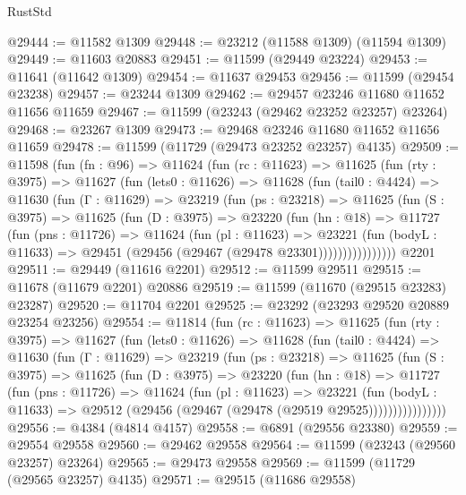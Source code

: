 \begin{lexlean}{RustStd}
\begin{coremodule}
@29444 := @11582 @1309
@29448 := @23212 (@11588 @1309) (@11594 @1309)
@29449 := @11603 @20883
@29451 := @11599 (@29449 @23224)
@29453 := @11641 (@11642 @1309)
@29454 := @11637 @29453
@29456 := @11599 (@29454 @23238)
@29457 := @23244 @1309
@29462 := @29457 @23246 @11680 @11652 @11656 @11659
@29467 := @11599 (@23243 (@29462 @23252 @23257) @23264)
@29468 := @23267 @1309
@29473 := @29468 @23246 @11680 @11652 @11656 @11659
@29478 := @11599 (@11729 (@29473 @23252 @23257) @4135)
@29509 := @11598
    (fun (fn : @96) =>
    @11624
      (fun (rc : @11623) =>
      @11625
        (fun (rty : @3975) =>
        @11627
          (fun (lets0 : @11626) =>
          @11628
            (fun (tail0 : @4424) =>
            @11630
              (fun (Γ : @11629) =>
              @23219
                (fun (ps : @23218) =>
                @11625
                  (fun (S : @3975) =>
                  @11625
                    (fun (D : @3975) =>
                    @23220
                      (fun (hn : @18) =>
                      @11727
                        (fun (pns : @11726) =>
                        @11624
                          (fun (pl : @11623) =>
                          @23221
                            (fun (bodyL : @11633) =>
                            @29451 (@29456 (@29467 (@29478 @23301))))))))))))))))
    @2201
@29511 := @29449 (@11616 @2201)
@29512 := @11599 @29511
@29515 := @11678 (@11679 @2201) @20886
@29519 := @11599 (@11670 (@29515 @23283) @23287)
@29520 := @11704 @2201
@29525 := @23292 (@23293 @29520 @20889 @23254 @23256)
@29554 := @11814
    (fun (rc : @11623) =>
    @11625
      (fun (rty : @3975) =>
      @11627
        (fun (lets0 : @11626) =>
        @11628
          (fun (tail0 : @4424) =>
          @11630
            (fun (Γ : @11629) =>
            @23219
              (fun (ps : @23218) =>
              @11625
                (fun (S : @3975) =>
                @11625
                  (fun (D : @3975) =>
                  @23220
                    (fun (hn : @18) =>
                    @11727
                      (fun (pns : @11726) =>
                      @11624
                        (fun (pl : @11623) =>
                        @23221
                          (fun (bodyL : @11633) =>
                          @29512 (@29456 (@29467 (@29478 (@29519 @29525))))))))))))))))
@29556 := @4384 (@4814 @4157)
@29558 := @6891 (@29556 @23380)
@29559 := @29554 @29558
@29560 := @29462 @29558
@29564 := @11599 (@23243 (@29560 @23257) @23264)
@29565 := @29473 @29558
@29569 := @11599 (@11729 (@29565 @23257) @4135)
@29571 := @29515 (@11686 @29558)

\end{coremodule}
\end{lexlean}
